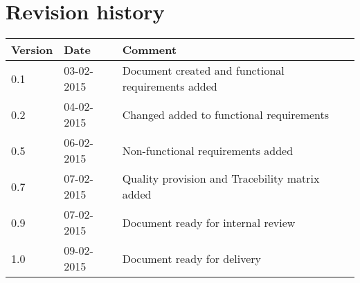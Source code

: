 \label{chp_revisionHistory}
\chapter{Revision history}

\begin{longtable}{| p{1.5cm}  | p{3cm} |  p{8cm} | }
	\hline
	\textbf{Version} & \textbf{Date} & \textbf{Comment} \\
	\hline
	0.1 & 03-02-2015 & Document created and functional requirements added  \\
	\hline
	0.2 & 04-02-2015 & Changed added to functional requirements \\
	\hline
	0.5 & 06-02-2015 & Non-functional requirements added \\
	\hline
	0.7 & 07-02-2015 & Quality provision and Tracebility matrix added \\
	\hline
	0.9 & 07-02-2015 & Document ready for internal review \\
	\hline
	1.0 & 09-02-2015 & Document ready for delivery \\
	\hline
\end{longtable}

